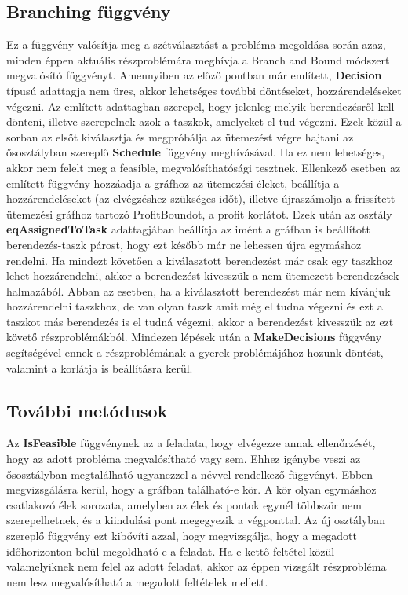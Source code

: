 \subsection{Branching függvény}
Ez a függvény valósítja meg a szétválasztást a probléma megoldása során azaz, minden éppen aktuális részproblémára meghívja a Branch and Bound módszert megvalósító függvényt. Amennyiben az előző pontban már említett, \textbf{Decision} típusú adattagja nem üres, akkor lehetséges további döntéseket, hozzárendeléseket végezni. Az említett adattagban szerepel, hogy jelenleg melyik berendezésről kell dönteni, illetve szerepelnek azok a taszkok, amelyeket el tud végezni. Ezek közül a sorban az elsőt kiválasztja és megpróbálja az ütemezést végre hajtani az ősosztályban szereplő \textbf{Schedule} függvény meghívásával. Ha ez nem lehetséges, akkor nem felelt meg a feasible, megvalósíthatósági tesztnek. Ellenkező esetben az említett függvény hozzáadja a gráfhoz az ütemezési éleket, beállítja a hozzárendeléseket (az elvégzéshez szükséges időt), illetve újraszámolja a frissített ütemezési gráfhoz tartozó ProfitBoundot, a profit korlátot. Ezek után az osztály \textbf{eqAssignedToTask} adattagjában beállítja az imént a gráfban is beállított berendezés-taszk párost, hogy ezt később már ne lehessen újra egymáshoz rendelni. Ha mindezt követően a kiválasztott berendezést már csak egy taszkhoz lehet hozzárendelni, akkor a berendezést kivesszük a nem ütemezett berendezések halmazából. Abban az esetben, ha a kiválasztott berendezést már nem kívánjuk hozzárendelni taszkhoz, de van olyan taszk amit még el tudna végezni és ezt a taszkot más berendezés is el tudná végezni, akkor a berendezést kivesszük az ezt követő részproblémákból. Mindezen lépések után a \textbf{MakeDecisions} függvény segítségével ennek a részproblémának a gyerek problémájához hozunk döntést, valamint a korlátja is beállításra kerül.
\subsection{További metódusok}
Az \textbf{IsFeasible} függvénynek az a feladata, hogy elvégezze annak ellenőrzését, hogy az adott probléma megvalósítható vagy sem. Ehhez igénybe veszi az ősosztályban megtalálható ugyanezzel a névvel rendelkező függvényt. Ebben  megvizsgálásra kerül, hogy a gráfban található-e kör. A kör olyan egymáshoz csatlakozó élek sorozata, amelyben az élek és pontok egynél többször nem szerepelhetnek, és a kiindulási pont megegyezik a végponttal. Az új osztályban szereplő függvény ezt kibővíti azzal, hogy megvizsgálja, hogy a megadott időhorizonton belül megoldható-e a feladat. Ha e kettő feltétel közül valamelyiknek nem felel az adott feladat, akkor az éppen vizsgált részprobléma nem lesz megvalósítható a megadott feltételek mellett.

